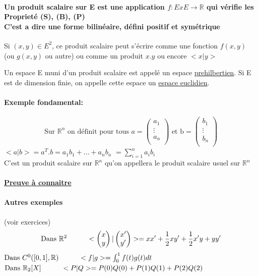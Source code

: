 \documentclass{article}
\newcommand\tab[1][1cm]{\hspace*{#1}}
\begin{document}
\paragraph{Un produit scalaire sur E est une application $f:ExE\rightarrow\mathbb{R}$ qui vérifie les Proprieté (S), (B), (P) \\
C'est a dire une forme bilinéaire, défini positif et symétrique \\}

Si $(x, y) \in E^2$, ce produit scalaire peut s'écrire comme une fonction $f(x,y)$ (ou $g(x,y)$ ou autre) ou comme un produit $x.y$ ou encore $<x|y>$

Un espace E muni d'un produit scalaire est appelé un espace \underline{prehilbertien}. Si E est de dimension finie, on appelle cette espace un \underline{espace euclidien}.

\paragraph{Exemple fondamental:}

$$
\mbox{Sur } \mathbb{R}^n \mbox{ on définit pour tous }
a = 
\begin{pmatrix}
    a_1\\
    \vdots\\
    a_n\\
\end{pmatrix}
\mbox{ et b} =
\begin{pmatrix}
    b_1\\
    \vdots\\
    b_n\\
\end{pmatrix}
$$
$<a | b> = a^T . b = a_1b_1 + \dots + a_nb_n$
$= \sum_{i=1}^{n} a_ib_i$ \\
C'est un produit scalaire sur $\mathbb{R}^n$ qu'on appellera le produit scalaire usuel sur $\mathbb{R}^n$

\paragraph{\underline{Preuve à connaitre}}
\paragraph{Autres exemples} (voir exercices)
$$\mbox{Dans } \mathbb{R}^2 \tab
<
\begin{pmatrix}
    x\\
    y\\
\end{pmatrix}
|
\begin{pmatrix}
    x'\\
    y'\\
\end{pmatrix}
> = xx' + \frac{1}{2}xy' + \frac{1}{2}x'y + yy'
$$
\tab[1.4cm] $\mbox{Dans } C^0([0,1], \mathbb{R}) \tab <f|g> = \int_{0}^{1}f(t)g(t)dt$ \\
\tab[1.4cm] $\mbox{Dans } \mathbb{R}_2[X] \tab <P|Q>=P(0)Q(0) + P(1)Q(1) + P(2)Q(2)$
\end{document}
